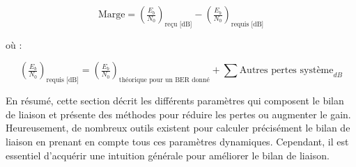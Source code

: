 \begin{equation}
\text{Marge} = \left(\tfrac{E_b}{N_{0}}\right)_{\text{reçu [dB]}} - \left(\tfrac{E_b}{N_{0}}\right)_{\text{requis [dB]}}
\end{equation}

où :

\begin{equation}
\left(\tfrac{E_b}{N_{0}}\right)_{\text{requis [dB]}} = \left(\tfrac{E_b}{N_{0}}\right)_{\text{théorique pour un BER donné}} + \sum \text{Autres pertes système}_{dB}
\end{equation}

En résumé, cette section décrit les différents paramètres qui composent le bilan de liaison et présente des méthodes pour réduire les pertes ou augmenter le gain. Heureusement, de nombreux outils existent pour calculer précisément le bilan de liaison en prenant en compte tous ces paramètres dynamiques. Cependant, il est essentiel d'acquérir une intuition générale pour améliorer le bilan de liaison.

